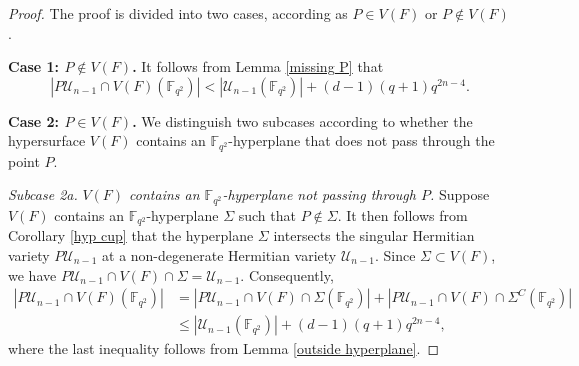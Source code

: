 \documentclass[10pt,a4paper,oneside]{amsproc}
\newcommand{\Fqt}{\mathbb{F}_{q^2}}
\newcommand{\U}{\mathcal{U}}
\begin{document}
\begin{proof}
The proof is divided into two cases, according as $P\in V(F)$ or $P\notin V(F)$.

    \textbf{Case 1: $P\notin V(F)$.} It follows from Lemma \ref{missing P} that $$|P\U_{n-1}\cap V(F)(\Fqt)|< |\U_{n-1}(\Fqt)|+(d-1)(q+1)q^{2n-4}.$$

    \textbf{Case 2: $P\in V(F)$.} We distinguish two subcases according to whether the hypersurface $V(F)$ contains an $\Fqt$-hyperplane that does not pass through the point $P$.


    \textit{Subcase 2a.} \textit{$V(F)$ contains an $\Fqt$-hyperplane not passing through $P$.} Suppose $V(F)$ contains an $\Fqt$-hyperplane $\Sigma$ such that $P\notin \Sigma$. It then follows from Corollary \ref{hyp cup} that the hyperplane $\Sigma$ intersects the singular Hermitian variety $P\U_{n-1}$ at a non-degenerate Hermitian variety $\U_{n-1}$. Since $\Sigma\subset V(F)$, we have $P\U_{n-1}\cap V(F)\cap \Sigma =\U_{n-1}$. Consequently, 
    \begin{align*}
        |P\U_{n-1}\cap V(F)(\Fqt)| &= |P\U_{n-1}\cap V(F)\cap \Sigma(\Fqt)|+|P\U_{n-1}\cap V(F)\cap \Sigma^C(\Fqt)|\\
        & \leq |\U_{n-1}(\Fqt)|+(d-1)(q+1)q^{2n-4},
        \end{align*}
        where the last inequality follows from Lemma \ref{outside hyperplane}.


\end{proof}
\end{document}
